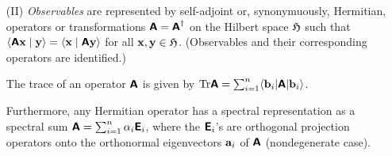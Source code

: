 {\begin{itemize}
A {\em pure  state} is represented by a  (unit) vector ${\bf x}$, also denoted by
$\mid  {\bf x}\rangle$,  of  the Hilbert space ${\frak H} $ spanning a one-dimensional subspace (manifold)
 ${\frak M}_{\bf x}$ of  the Hilbert space ${\frak H} $.
Equivalently, it is represented by the one-dimensional subspace (manifold) ${\frak M}_{\bf x}$ of  the Hilbert space ${\frak H} $ spannned by the vector ${\bf x}$.
Equivalently, it is represented by
the projector  $ \textsf{\textbf{E}}_{\bf x}=\mid {\bf x}\rangle \langle {\bf x} \mid$
onto the unit  vector ${\bf x}$ of  the Hilbert space ${\frak H} $.

Therefore, if two vectors ${\bf x},{\bf y}\in {\frak H}$ represent pure
states, their vector sum
${\bf z}={\bf x}+{\bf y}\in{\frak H}$ represents a pure state as well.
This state ${\bf z}$ is called the {\em coherent superposition} of state ${\bf x}$
and
${\bf y}$. Coherent state superpositions between classically mutually exclusive (i.e. orthogonal) states, say
$\mid  {\bf 0}\rangle$
and
$\mid  {\bf 1}\rangle$,
 will become most important in quantum
information theory.


Any pure state ${\bf x}$ can be written as a linear
combination of
the set of orthonormal base vectors $\{{\bf b}_1,{\bf b}_2,\cdots {\bf b}_n\}$,
that is,
${\bf x} =\sum_{i=1}^n   \beta_i {\bf b}_i$, where $n$ is the dimension of ${\frak H}$ and
$\beta_i=\langle {\bf b}_i \mid {\bf x}\rangle \in {\Bbb C}$.

In the Dirac bra-ket notation, unity is given by
${\bf 1}=\sum_{i=1}^n \vert {\bf b}_i\rangle \langle {\bf b}_i\vert $,
or just ${\bf 1}=\sum_{i=1}^n \vert i\rangle \langle i\vert $.

\item[(II)]
{\em Observables}  are represented by self-adjoint or, synonymuously, Hermitian,
operators or transformations   $ \textsf{\textbf{A}}= \textsf{\textbf{A}}^\dagger$
on the Hilbert space ${\frak H}$ such that $\langle  \textsf{\textbf{A}} {\bf x}\mid
{\bf y}\rangle=\langle  {\bf x}\mid
\textsf{\textbf{A}} {\bf y}\rangle$ for all
${\bf x},{\bf y}\in {\frak H}$. (Observables and their corresponding operators are
identified.)

The trace of an operator  $ \textsf{\textbf{A}}$ is given by
$\textrm{Tr}  \textsf{\textbf{A}} =\sum_{i=1}^n \langle {\bf b}_i\vert   \textsf{\textbf{A}} \vert{\bf b}_i \rangle$.


Furthermore,
any Hermitian operator has a spectral representation   as a spectral sum
$  \textsf{\textbf{A}} =\sum_{i=1}^n \alpha_i    \textsf{\textbf{E}}_i$,
where the $  \textsf{\textbf{E}} _i$'s  are orthogonal projection operators onto the
orthonormal eigenvectors ${\bf a}_i$ of $   \textsf{\textbf{A}}$ (nondegenerate
case).


\end{itemize}}
